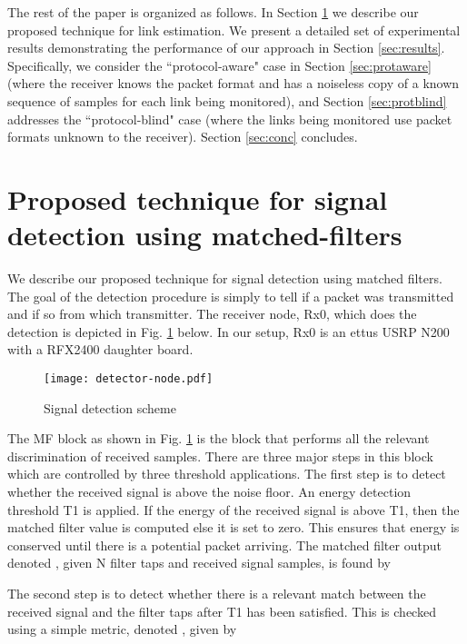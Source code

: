 \documentclass[journal]{IEEEtran}
\begin{document}
The rest of the paper is organized as follows. In Section \ref{sec:mf} we
describe our proposed technique for link estimation. We present a detailed set
of experimental results demonstrating the performance of our approach in
Section \ref{sec:results}. Specifically, we consider the ``protocol-aware" case
in Section \ref{sec:protaware} (where the receiver knows the packet format and
has a noiseless copy of a known sequence of samples for each link being
monitored), and Section \ref{sec:protblind} addresses the ``protocol-blind"
case (where the links being monitored use packet formats unknown to the
receiver). Section \ref{sec:conc} concludes.

\section{Proposed technique for signal detection using matched-filters}
\label{sec:mf}

We describe our proposed technique for signal detection using matched filters. The goal of the detection procedure is simply to tell if a packet was transmitted and if so from which transmitter. The receiver node, Rx0, which does the detection is depicted in Fig. \ref{fig:detector-node} below. In our setup, Rx0 is an ettus USRP N200 with a RFX2400 daughter board. 

\begin{figure}[htb]
\begin{center}
	\texttt{[image: detector-node.pdf]} 
\caption{Signal detection scheme}
\label{fig:detector-node}
\end{center}
\end{figure}

The MF block as shown in Fig. \ref{fig:detector-node} is the block that performs all the relevant discrimination of received samples. There are three major steps in this block which are controlled by three threshold applications. The first step is to detect whether the received signal is above the noise floor. An energy detection threshold T1 is applied. If the energy of the received signal is above T1, then the matched filter value is computed else it is set to zero. This ensures that energy is conserved until there is a potential packet arriving. The matched filter output denoted , given N filter taps  and received signal samples,  is found by


The second step is to detect whether there is a relevant match between the received signal and the filter taps after T1 has been satisfied. This is checked using a simple metric, denoted , given by
\end{document}

